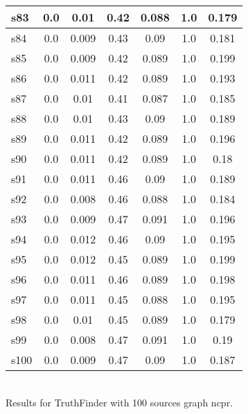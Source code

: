\documentclass{article}
\begin{document}
\begin{tabular}{|l|c|c|c|c|c|c|}
\hline
s83 &0.0 & 0.01 & 0.42 & 0.088 & 1.0 & 0.179\\
\hline
s84 &0.0 & 0.009 & 0.43 & 0.09 & 1.0 & 0.181\\
\hline
s85 &0.0 & 0.009 & 0.42 & 0.089 & 1.0 & 0.199\\
\hline
s86 &0.0 & 0.011 & 0.42 & 0.089 & 1.0 & 0.193\\
\hline
s87 &0.0 & 0.01 & 0.41 & 0.087 & 1.0 & 0.185\\
\hline
s88 &0.0 & 0.01 & 0.43 & 0.09 & 1.0 & 0.189\\
\hline
s89 &0.0 & 0.011 & 0.42 & 0.089 & 1.0 & 0.196\\
\hline
s90 &0.0 & 0.011 & 0.42 & 0.089 & 1.0 & 0.18\\
\hline
s91 &0.0 & 0.011 & 0.46 & 0.09 & 1.0 & 0.189\\
\hline
s92 &0.0 & 0.008 & 0.46 & 0.088 & 1.0 & 0.184\\
\hline
s93 &0.0 & 0.009 & 0.47 & 0.091 & 1.0 & 0.196\\
\hline
s94 &0.0 & 0.012 & 0.46 & 0.09 & 1.0 & 0.195\\
\hline
s95 &0.0 & 0.012 & 0.45 & 0.089 & 1.0 & 0.199\\
\hline
s96 &0.0 & 0.011 & 0.46 & 0.089 & 1.0 & 0.198\\
\hline
s97 &0.0 & 0.011 & 0.45 & 0.088 & 1.0 & 0.195\\
\hline
s98 &0.0 & 0.01 & 0.45 & 0.089 & 1.0 & 0.179\\
\hline
s99 &0.0 & 0.008 & 0.47 & 0.091 & 1.0 & 0.19\\
\hline
s100 &0.0 & 0.009 & 0.47 & 0.09 & 1.0 & 0.187\\
\hline
\end{tabular}\\

\noindent Results for TruthFinder with 100 sources graph ncpr.
\end{document}
